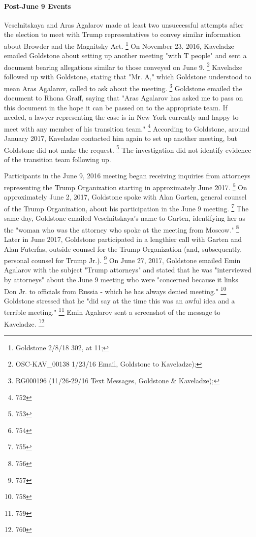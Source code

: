 \paragraph{Post-June 9 Events}

Veselnitskaya and Aras Agalarov made at least two unsuccessful attempts after the election to meet with Trump representatives to convey similar information about Browder and the Magnitsky Act.%
\footnote{Goldstone 2/8/18 302, at 11; }
On November 23, 2016, Kaveladze emailed Goldstone about setting up another meeting "with T people" and sent a document bearing allegations similar to those conveyed on June 9.%
\footnote{OSC-KAV\_00138 1/23/16 Email, Goldstone to Kaveladze); }
Kaveladze followed up with Goldstone, stating that "Mr. A," which Goldstone understood to mean Aras Agalarov, called to ask about the meeting.%
\footnote{RG000196 (11/26-29/16 Text Messages, Goldstone \& Kaveladze); }
Goldstone emailed the document to Rhona Graff, saying that "Aras Agalarov has asked me to pass on this document in the hope it can be passed on to the appropriate team.
If needed, a lawyer representing the case is in New York currently and happy to meet with any member of his transition team."%
\footnote{752}
According to Goldstone, around January 2017, Kaveladze contacted him again to set up another meeting, but Goldstone did not make the request.%
\footnote{753}
The investigation did not identify evidence of the transition team following up.

Participants in the June 9, 2016 meeting began receiving inquiries from attorneys representing the Trump Organization starting in approximately June 2017.%
\footnote{754}
On approximately June 2, 2017, Goldstone spoke with Alan Garten, general counsel of the Trump Organization, about his participation in the June 9 meeting.%
\footnote{755}
The same day, Goldstone emailed Veselnitskaya's name to Garten, identifying her as the "woman who was the attorney who spoke at the meeting from Moscow."%
\footnote{756}
Later in June 2017, Goldstone participated in a lengthier call with Garten and Alan Futerfas, outside counsel for the Trump Organization (and, subsequently, personal counsel for Trump Jr.).%
\footnote{757}
On June 27, 2017, Goldstone emailed Emin Agalarov with the subject "Trump attorneys" and stated that he was "interviewed by attorneys" about the June 9 meeting who were "concerned because it links Don Jr. to officials from Russia - which he has always denied meeting."%
\footnote{758}
Goldstone stressed that he "did say at the time this was an awful idea and a terrible meeting."%
\footnote{759}
Emin Agalarov sent a screenshot of the message to Kaveladze.%
\footnote{760}

